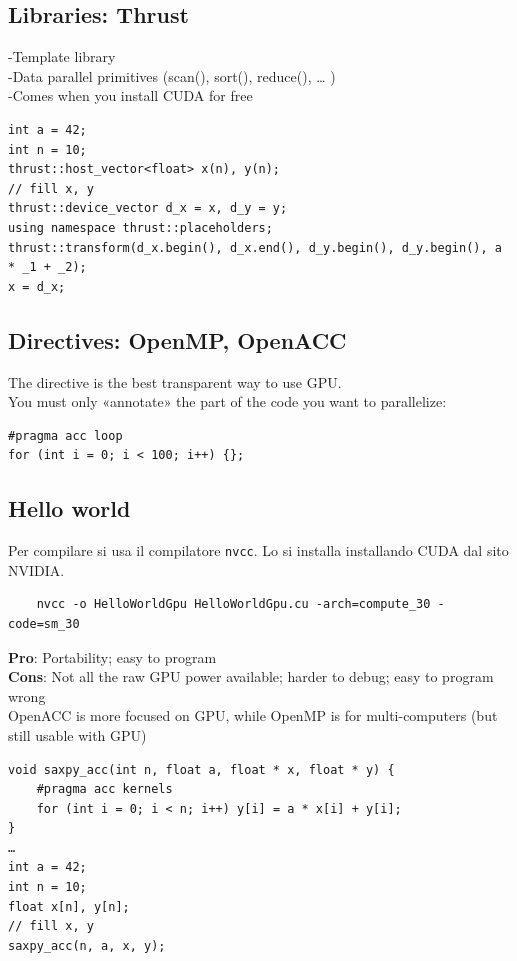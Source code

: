 \subsection{Libraries: Thrust}

-Template library\\
-Data parallel primitives (scan(), sort(), reduce(), … )\\
-Comes when you install CUDA for free\\

\begin{verbatim}
int a = 42;
int n = 10;
thrust::host_vector<float> x(n), y(n);
// fill x, y
thrust::device_vector d_x = x, d_y = y;
using namespace thrust::placeholders;
thrust::transform(d_x.begin(), d_x.end(), d_y.begin(), d_y.begin(), a * _1 + _2);
x = d_x;
\end{verbatim}

\subsection{Directives: OpenMP, OpenACC}

The directive is the best transparent way to use GPU.\\
You must only «annotate» the part of the code you want to parallelize:
\begin{verbatim}
#pragma acc loop
for (int i = 0; i < 100; i++) {};
\end{verbatim}

\subsection{Hello world}

Per compilare si usa il compilatore \texttt{nvcc}. Lo si installa installando CUDA dal sito NVIDIA.

\begin{verbatim}
	nvcc -o HelloWorldGpu HelloWorldGpu.cu -arch=compute_30 -code=sm_30
\end{verbatim}

\noindent
\textbf{Pro}: Portability; easy to program\\
\textbf{Cons}: Not all the raw GPU power available; harder to debug; easy to program wrong\\

OpenACC is more focused on GPU, while OpenMP is for multi-computers (but still usable with GPU)\\

\begin{verbatim}
void saxpy_acc(int n, float a, float * x, float * y) {
	#pragma acc kernels
	for (int i = 0; i < n; i++) y[i] = a * x[i] + y[i];
}
…
int a = 42;
int n = 10;
float x[n], y[n];
// fill x, y
saxpy_acc(n, a, x, y);
\end{verbatim}


